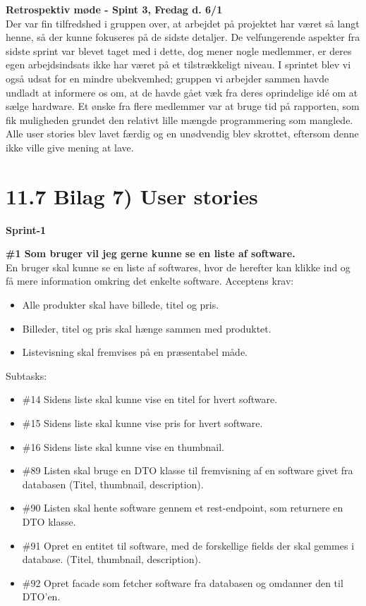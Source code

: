 \documentclass[11pt]{report}
\begin{document}
\noindent\textbf{Retrospektiv møde - Spint 3, Fredag d. 6/1}\\
\noindent Der var fin tilfredshed i gruppen over, at arbejdet på projektet har været så langt henne, så der kunne fokuseres på de sidste detaljer. De velfungerende aspekter fra sidste sprint var blevet taget med i dette, dog mener nogle medlemmer, er deres egen arbejdsindsats ikke har været på et tilstrækkeligt niveau. I sprintet blev vi også udsat for en mindre ubekvemhed; gruppen vi arbejder sammen havde undladt at informere os om, at de havde gået væk fra deres oprindelige idé om at sælge hardware. Et ønske fra flere medlemmer var at bruge tid på rapporten, som fik muligheden grundet den relativt lille mængde programmering som manglede. Alle user stories blev lavet færdig og en unødvendig blev skrottet, eftersom denne ikke ville give mening at lave.

\newpage
\section*{11.7 Bilag 7) User stories}
\noindent\textbf{Sprint-1}

\noindent\textbf{\#1 Som bruger vil jeg gerne kunne se en liste af software.}\\
\noindent En bruger skal kunne se en liste af softwares, hvor de herefter kan klikke ind og få mere information omkring det enkelte software.
\noindent Acceptens krav:
\begin{itemize}[topsep=0pt, partopsep=0pt]
  \item Alle produkter skal have billede, titel og pris.
  \item Billeder, titel og pris skal hænge sammen med produktet.
  \item Listevisning skal fremvises på en præsentabel måde.
\end{itemize}
\noindent Subtasks:
\begin{itemize}[topsep=0pt, partopsep=0pt]
  \item \#14 Sidens liste skal kunne vise en titel for hvert software.
  \item \#15 Sidens liste skal kunne vise pris for hvert software.
  \item \#16 Sidens liste skal kunne vise en thumbnail.
  \item \#89 Listen skal bruge en DTO klasse til fremvisning af en software givet fra databasen (Titel, thumbnail, description).
  \item \#90 Listen skal hente software gennem et rest-endpoint, som returnere en DTO klasse.
  \item \#91 Opret en entitet til software, med de forskellige fields der skal gemmes i database. (Titel, thumbnail, description).
  \item \#92 Opret facade som fetcher software fra databasen og omdanner den til DTO’en.
\end{itemize}
\end{document}
